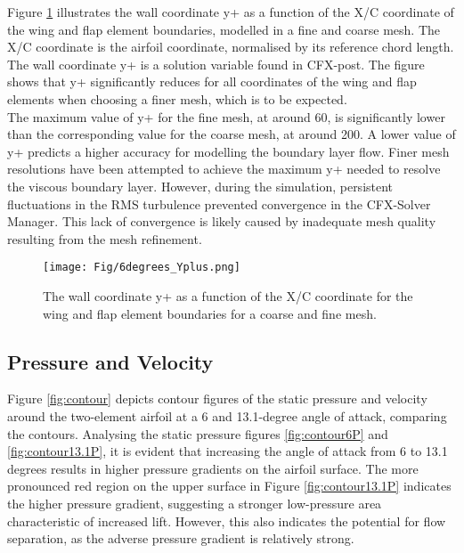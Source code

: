 Figure \ref{fig:wallcoordinate} illustrates the wall coordinate y+ as a function of the X/C coordinate of the wing and flap element boundaries, modelled in a fine and coarse mesh. The X/C coordinate is the airfoil coordinate, normalised by its reference chord length. The wall coordinate y+ is a solution variable found in CFX-post. The figure shows that y+ significantly reduces for all coordinates of the wing and flap elements when choosing a finer mesh, which is to be expected. \\

The maximum value of y+ for the fine mesh, at around 60, is significantly lower than the corresponding value for the coarse mesh, at around 200. A lower value of y+ predicts a higher accuracy for modelling the boundary layer flow. Finer mesh resolutions have been attempted to achieve the maximum y+ needed to resolve the viscous boundary layer. However, during the simulation, persistent fluctuations in the RMS turbulence prevented convergence in the CFX-Solver Manager. This lack of convergence is likely caused by inadequate mesh quality resulting from the mesh refinement.



\begin{figure}[H]
  \centering
    \texttt{[image: Fig/6degrees\_Yplus.png]}
  \caption{The wall coordinate y+ as a function of the X/C coordinate for the wing and flap element boundaries for a coarse and fine mesh.}
  \label{fig:wallcoordinate}
\end{figure}


\subsection{Pressure and Velocity}
Figure \ref{fig:contour} depicts contour figures of the static pressure and velocity around the two-element airfoil at a 6 and 13.1-degree angle of attack, comparing the contours. Analysing the static pressure figures \ref{fig:contour6P} and \ref{fig:contour13.1P}, it is evident that increasing the angle of attack from 6 to 13.1 degrees results in higher pressure gradients on the airfoil surface. The more pronounced red region on the upper surface in Figure \ref{fig:contour13.1P} indicates the higher pressure gradient, suggesting a stronger low-pressure area characteristic of increased lift. However, this also indicates the potential for flow separation, as the adverse pressure gradient is relatively strong.\\


